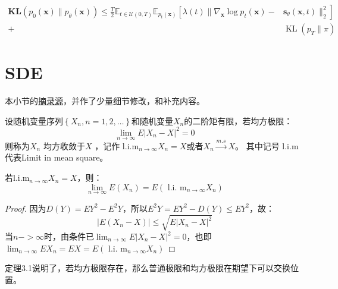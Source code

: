\begin{equation}
  \begin{aligned} \mathbf{KL}\left(p_0(\mathbf{x}) \| p_\theta(\mathbf{x})\right) \leq \frac{T}{2} \mathbb{E}_{t \in \mathcal{U}(0, T)} \mathbb{E}_{p_t(\mathbf{x})}\left[\lambda(t) \| \nabla_{\mathbf{x}} \log p_t(\mathbf{x})-\right.
    & \left.\mathbf{s}_\theta(\mathbf{x}, t) \|_2^2\right] \\ +
    & \operatorname{KL}\left(p_T \| \pi\right)
  \end{aligned}
\end{equation}


\section{SDE}
本小节的\href{https://zhuanlan.zhihu.com/p/619188621}{摘录源}，并作了少量细节修改，和补充内容。

\begin{definition}
  设随机变量序列$\left\{X_n, n=1,2, \ldots\right\}$和随机变量$ X_n$的二阶矩有限，若均方极限：
  \begin{equation}
    \lim _{n \rightarrow \infty} E\left|X_n-X\right|^2=0
  \end{equation}
 则称为$X_n$ 均方收敛于$X$ ，记作  $\mathrm{l.i.m}_{n \rightarrow \infty} X_n=X$或者$X_n \xrightarrow{m . s} X$。
 其中记号 l.i.m代表Limit in mean square。
\end{definition}

\begin{theorem}
  若$\mathrm{l.i.m}_{n \rightarrow \infty} X_n=X$，则：
  \begin{equation}
    \lim _{n \rightarrow \infty} E\left(X_n\right)=E\left(\text { l.i. } \mathrm{m}_{n \rightarrow \infty} X_n\right)
  \end{equation}
\end{theorem}

\begin{proof}
  因为$D(Y)=E Y^2-E^2 Y$，所以$E^2Y = EY^2 - D(Y) \leq EY^2$，故：
  \begin{equation}
    \left|E\left(X_n-X\right)\right| \leq \sqrt{E\left|X_n-X\right|^2}
  \end{equation}
  当$n->\infty$时，由条件已$\lim _{n \rightarrow \infty} E\left|X_n-X\right|^2=0$，也即
  $\lim _{n \rightarrow \infty} E X_n=E X=E\left(\right.$ l.i. $\left.\mathrm{m}_{n \rightarrow \infty} X_n\right)$
\end{proof}
定理3.1说明了，若均方极限存在，那么普通极限和均方极限在期望下可以交换位置。

